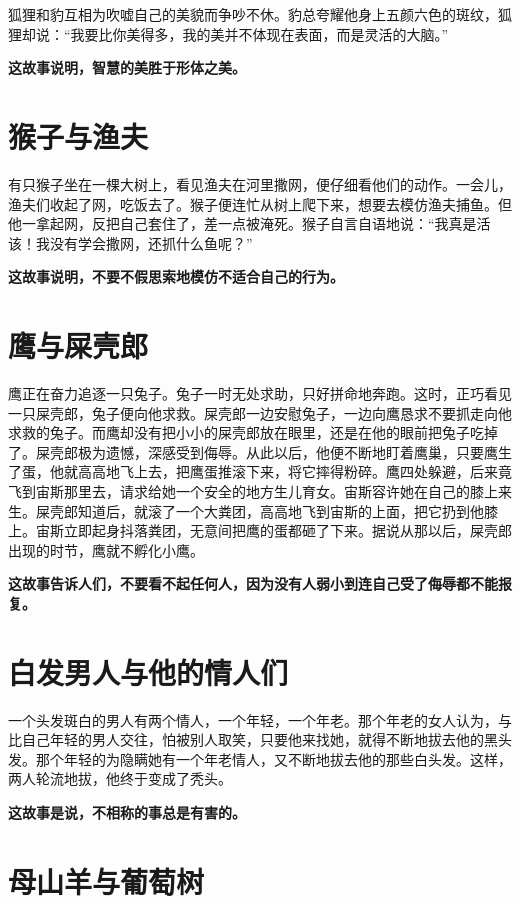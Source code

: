 狐狸和豹互相为吹嘘自己的美貌而争吵不休。豹总夸耀他身上五颜六色的斑纹，狐狸却说：“我要比你美得多，我的美并不体现在表面，而是灵活的大脑。”

{\bfseries \color{red}这故事说明，智慧的美胜于形体之美。}

\section{猴子与渔夫}

有只猴子坐在一棵大树上，看见渔夫在河里撒网，便仔细看他们的动作。一会儿，渔夫们收起了网，吃饭去了。猴子便连忙从树上爬下来，想要去模仿渔夫捕鱼。但他一拿起网，反把自己套住了，差一点被淹死。猴子自言自语地说：“我真是活该！我没有学会撒网，还抓什么鱼呢？”

{\bfseries \color{red}这故事说明，不要不假思索地模仿不适合自己的行为。}

\section{鹰与屎壳郎}

鹰正在奋力追逐一只兔子。兔子一时无处求助，只好拼命地奔跑。这时，正巧看见一只屎壳郎，兔子便向他求救。屎壳郎一边安慰兔子，一边向鹰恳求不要抓走向他求救的兔子。而鹰却没有把小小的屎壳郎放在眼里，还是在他的眼前把兔子吃掉了。屎壳郎极为遗憾，深感受到侮辱。从此以后，他便不断地盯着鹰巢，只要鹰生了蛋，他就高高地飞上去，把鹰蛋推滚下来，将它摔得粉碎。鹰四处躲避，后来竟飞到宙斯那里去，请求给她一个安全的地方生儿育女。宙斯容许她在自己的膝上来生。屎壳郎知道后，就滚了一个大粪团，高高地飞到宙斯的上面，把它扔到他膝上。宙斯立即起身抖落粪团，无意间把鹰的蛋都砸了下来。据说从那以后，屎壳郎出现的时节，鹰就不孵化小鹰。

{\bfseries \color{red}这故事告诉人们，不要看不起任何人，因为没有人弱小到连自己受了侮辱都不能报复。}

\section{白发男人与他的情人们}

一个头发斑白的男人有两个情人，一个年轻，一个年老。那个年老的女人认为，与比自己年轻的男人交往，怕被别人取笑，只要他来找她，就得不断地拔去他的黑头发。那个年轻的为隐瞒她有一个年老情人，又不断地拔去他的那些白头发。这样，两人轮流地拔，他终于变成了秃头。

{\bfseries \color{red}这故事是说，不相称的事总是有害的。}

\section{母山羊与葡萄树}

